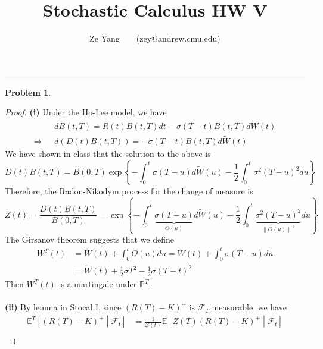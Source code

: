 \documentclass[a4paper, 10pt]{article}
\title{\textbf{Stochastic Calculus HW V}}
\author{Ze Yang~~~~(zey@andrew.cmu.edu)}
\theoremstyle{definition}
\newtheorem{problem}{Problem}
\theoremstyle{hSol}
\begin{document}
\maketitle



\noindent\rule{16cm}{0.4pt}
\begin{problem} 
\end{problem}
\begin{proof} \textbf{(i)} Under the Ho-Lee model, we have
\begin{equation}
  \begin{split}
    &dB(t,T) = R(t)B(t,T)dt - \sigma (T-t)B(t,T)d\widetilde{W}(t)\\
    \Rightarrow ~~~& d(D(t)B(t,T)) = - \sigma (T-t)B(t,T)d\widetilde{W}(t)
  \end{split}
\end{equation}
We have shown in class that the solution to the above is
\begin{equation}
  D(t)B(t,T) = B(0,T) \exp \left\{ -\int_0^t \sigma (T-u)d\widetilde{W}(u) - \frac{1}{2}\int_0^t \sigma^2 (T-u)^2 du \right\}
\end{equation}
Therefore, the Radon-Nikodym process for the change of measure is
\begin{equation}
  Z(t) = \frac{D(t)B(t,T)}{B(0,T)} = \exp \left\{ -\int_0^t \underbrace{\sigma (T-u)}_{\Theta(u)}d\widetilde{W}(u) - \frac{1}{2}\int_0^t \underbrace{\sigma^2 (T-u)^2}_{\left\lVert\Theta(u)\right\rVert^2} du \right\}
\end{equation}
The Girsanov theorem suggests that we define
\begin{equation}
  \begin{split}
    W^T(t) &= \widetilde{W}(t) + \int_0^t \Theta(u) du = \widetilde{W}(t) + \int_0^t \sigma(T-u) du \\
    &=  \widetilde{W}(t) + \frac{1}{2}\sigma T^2 - \frac{1}{2}\sigma (T-t)^2
  \end{split}
\end{equation}
Then $W^T(t)$ is a martingale under $\mathbb{P}^T$.\\
~\\
\textbf{(ii)} By lemma in Stocal I, since $(R(T)-K)^+$ is $\mathcal{F}_T$ measurable, we have
\begin{equation}
  \begin{split}
    \mathbb{E}^T\left[(R(T)-K)^+\middle|\mathcal{F}_t\right] &= \frac{1}{Z(t)}  \widetilde{\mathbb{E}}\left[Z(T)(R(T)-K)^+\middle|\mathcal{F}_t\right]  \\ 

\end{split}
\end{equation}
\end{proof}
\end{document}
